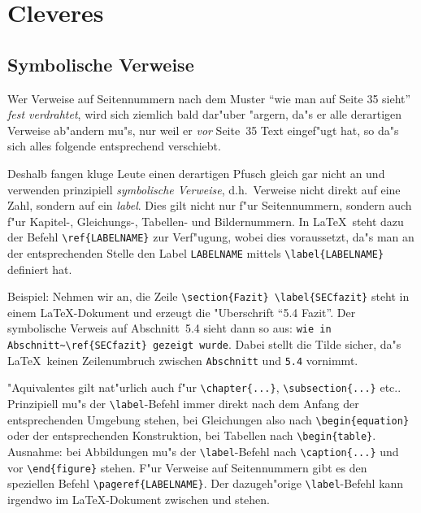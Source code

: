 \chapter{Cleveres} \label{CPTsim} 
%
\section{Symbolische Verweise} \label{SECverw}
%
Wer Verweise auf Seitennummern nach dem Muster ``wie man auf Seite 35 sieht'' 
{\em fest verdrahtet}, wird sich ziemlich bald dar"uber "argern, da"s er alle derartigen 
Verweise ab"andern mu"s, nur weil er {\em vor} Seite~35 Text eingef"ugt hat, 
so da"s sich alles folgende entsprechend verschiebt.

Deshalb fangen kluge Leute einen derartigen Pfusch gleich gar nicht an
und verwenden prinzipiell {\em symbolische Verweise}, d.h.\ Verweise nicht direkt
auf eine Zahl, sondern auf ein {\em label}. Dies gilt nicht nur f"ur Seitennummern,
sondern auch f"ur Kapitel-, Gleichungs-, Tabellen- und Bildernummern.
In \LaTeX\ steht dazu der Befehl \verb+\ref{LABELNAME}+ zur Verf"ugung, 
wobei dies voraussetzt, da"s man an der entsprechenden Stelle den Label {\tt LABELNAME}
mittels \verb+\label{LABELNAME}+ definiert hat.

Beispiel: Nehmen wir an, die Zeile \verb+\section{Fazit} \label{SECfazit}+
steht in einem \LaTeX-Dokument und erzeugt die "Uberschrift ``5.4 Fazit''.
Der symbolische Verweis auf Abschnitt~5.4 sieht dann so aus:\quad
\verb+wie in Abschnitt~\ref{SECfazit} gezeigt wurde+. Dabei stellt die
Tilde sicher, da"s \LaTeX\ keinen Zeilenumbruch zwischen {\tt Abschnitt} und
{\tt 5.4} vornimmt.

"Aquivalentes gilt nat"urlich auch f"ur \verb+\chapter{...}+, \verb+\subsection{...}+ etc..
Prinzipiell mu"s der \verb+\label+-Befehl immer direkt nach dem Anfang der entsprechenden
Umgebung stehen, bei Gleichungen also nach \verb+\begin{equation}+ oder der entsprechenden
Konstruktion, bei Tabellen nach \verb+\begin{table}+. Ausnahme: bei Abbildungen mu"s
der \verb+\label+-Befehl nach \verb+\caption{...}+ und vor \verb+\end{figure}+ stehen.
F"ur Verweise auf Seitennummern gibt es den speziellen Befehl \verb+\pageref{LABELNAME}+.
Der dazugeh"orige \verb+\label+-Befehl kann irgendwo im \LaTeX-Dokument zwischen 
\verb++ und \verb++ stehen.

